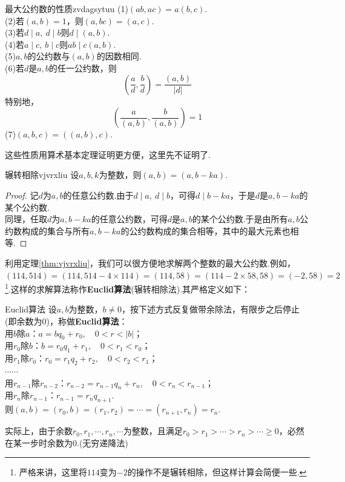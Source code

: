 \documentclass[lang=cn, zihao=5]{elegantbook}
\newcommand{\ssb}[1]{\left( #1 \right)}
\begin{document}
\begin{theorem}{最大公约数的性质}{zvdagsytuu}
	(1)$(ab,ac)=a(b,c)$. \\ 
	(2)若$(a,b)=1$，则$(a,bc)=(a,c)$. \\
	(3)若$d \mid a,~d \mid b$则$d \mid (a,b)$. \\
	(4)若$a \mid c,~b \mid c$则$ab \mid c(a,b)$. \\
	(5)$a,b$的公约数与$(a,b)$的因数相同. \\
	(6)若$d$是$a,b$的任一公约数，则$$\ssb{\frac{a}{d},\frac{b}{d}} = \frac{(a,b)}{|d|}$$
	特别地，$$\ssb{\frac{a}{(a,b)},\frac{b}{(a,b)}}=1$$
	(7)$(a,b,c)=((a,b),c)$.
\end{theorem}
\begin{remark}
	这些性质用算术基本定理证明更方便，这里先不证明了.
\end{remark}

\begin{theorem}{辗转相除}{vjvrxliu}
	设$a,b,k$为整数，则$(a,b)=(a,b-ka)$.
\end{theorem}
\begin{proof}
	记$d$为$a,b$的任意公约数.由于$d \mid a,~d \mid b$，可得$d \mid b-ka$，于是$d$是$a,b-ka$的某个公约数. \\
	同理，任取$d$为$a,b-ka$的任意公约数，可得$d$是$a,b$的某个公约数.于是由所有$a,b$公约数构成的集合与所有$a,b-ka$的公约数构成的集合相等，其中的最大元素也相等.
\end{proof}

利用定理\ref{thm:vjvrxliu}，我们可以很方便地求解两个整数的最大公约数.例如，$(114,514)=(114,514-4\times 114) = (114,58) = (114-2\times 58 ,58)=(-2,58)=2$\footnote{严格来讲，这里将$114$变为$-2$的操作不是辗转相除，但这样计算会简便一些.}.这样的求解算法称作\textbf{Euclid算法}(辗转相除法).其严格定义如下：

\begin{theorem}{Euclid算法}
	设$a,b$为整数，$b \neq 0$，按下述方式反复做带余除法，有限步之后停止(即余数为$0$)，称做\textbf{Euclid算法}： \\
	用$b$除$a$：$a=bq_0+r_0,\quad 0<r<|b|$； \\
	用$r_0$除$b$：$b=r_0q_1+r_1,\quad 0<r_1<r_0$； \\
	用$r_1$除$r_0$：$r_0=r_1q_2+r_2,\quad 0<r_2<r_1$； \\
	$\cdots \cdots$ \\
	用$r_{n-1}$除$r_{n-2}$：$r_{n-2}=r_{n-1}q_n+r_n,\quad 0<r_n<r_{n-1}$； \\
	用$r_n$除$r_{n-1}$：$r_{n-1}=r_nq_{n+1}$. \\
	则$(a,b)=(r_0,b)=(r_1,r_2)= \cdots = (r_{n+1},r_n)=r_n$.
\end{theorem}
\begin{remark}
	实际上，由于余数$r_0,r_1,\cdots ,r_n,\cdots $为整数，且满足$r_0 > r_1 > \cdots > r_{n} > \cdots \geq 0$，必然在某一步时余数为$0$.(无穷递降法)
\end{remark}
\end{document}
